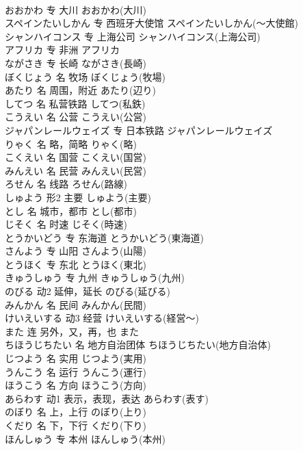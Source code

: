 \documentclass[8pt]{extreport}
\begin{document}
\begin{CJK}{UTF8}{min}
\\	おおかわ	专	大川	おおかわ(大川)	
\\	スペインたいしかん	专	西班牙大使馆	スペインたいしかん(～大使館)	
\\	シャンハイコンス	专	上海公司	シャンハイコンス(上海公司)	
\\	アフリカ	专	非洲	アフリカ	
\\	ながさき	专	长崎	ながさき(長崎)	
\\	ぼくじょう	名	牧场	ぼくじょう(牧場)	
\\	あたり	名	周围，附近	あたり(辺り)	
\\	してつ	名	私营铁路	してつ(私鉄)	
\\	こうえい	名	公营	こうえい(公営)	
\\	ジャパンレールウェイズ	专	日本铁路	ジャパンレールウェイズ
\\	りゃく	名	略，简略	りゃく(略)	
\\	こくえい	名	国营	こくえい(国営)	
\\	みんえい	名	民营	みんえい(民営)	
\\	ろせん	名	线路	ろせん(路線)	
\\	しゅよう	形2	主要	しゅよう(主要)	
\\	とし	名	城市，都市	とし(都市)	
\\	じそく	名	时速	じそく(時速)	
\\	とうかいどう	专	东海道	とうかいどう(東海道)	
\\	さんよう	专	山阳	さんよう(山陽)	
\\	とうほく	专	东北	とうほく(東北)	
\\	きゅうしゅう	专	九州	きゅうしゅう(九州)	
\\	のびる	动2	延伸，延长	のびる(延びる)	
\\	みんかん	名	民间	みんかん(民間)	
\\	けいえいする	动3	经营	けいえいする(経営～)	
\\	また	连	另外，又，再，也	また	
\\	ちほうじちたい	名	地方自治团体	ちほうじちたい(地方自治体)	
\\	じつよう	名	实用	じつよう(実用)	
\\	うんこう	名	运行	うんこう(運行)	
\\	ほうこう	名	方向	ほうこう(方向)	
\\	あらわす	动1	表示，表现，表达	あらわす(表す)	
\\	のぼり	名	上，上行	のぼり(上り)	
\\	くだり	名	下，下行	くだり(下り)	
\\	ほんしゅう	专	本州	ほんしゅう(本州)	

\end{CJK}
\end{document}

